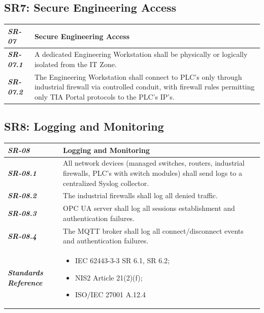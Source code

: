 \documentclass[11pt,a4paper]{article}
\begin{document}
\subsection{SR7: Secure Engineering Access}\label{SR7}
\begin{tabularx}{\textwidth}{>{\bfseries}p{2.5cm} X}
    \textit{SR-07} & \textbf{Secure Engineering Access} \vspace{0.5em}\\
\toprule
\textit{SR-07.1} &
    A dedicated Engineering Workstation shall be physically or logically isolated from the IT Zone.
    \vspace{0.5em}
\\
\textit{SR-07.2} &
    The Engineering Workstation shall connect to PLC's only through industrial firewall via controlled conduit, with firewall rules permitting only TIA Portal protocols to the PLC's IP's. 
    \vspace{0.5em}
    \\
\end{tabularx}
\vspace{2em}

\subsection{SR8: Logging and Monitoring}\label{SR8}
\begin{tabularx}{\textwidth}{>{\bfseries}p{2.5cm} X}
    \textit{SR-08} & \textbf{Logging and Monitoring} \vspace{0.5em}\\
\toprule
\textit{SR-08.1} &
    All network devices (managed switches, routers, industrial firewalls, PLC's with switch modules) shall send logs to a centralized Syslog collector.
    \vspace{0.5em}
\\
\textit{SR-08.2} &
    The industrial firewalls shall log all denied traffic.
    \vspace{0.5em}
    \\
\textit{SR-08.3} &
    OPC UA server shall log all sessions establishment and authentication failures.
    \vspace{0.5em}
    \\
\textit{SR-08.4} &
    The MQTT broker shall log all connect/disconnect events and authentication failures.
    \vspace{0.5em}
    \\
\midrule
    \textit{Standards Reference} &
\begin{itemize}[label=-, noitemsep, topsep=0pt, leftmargin=*]
    \item IEC 62443-3-3 SR 6.1, SR 6.2;
    \item NIS2 Article 21(2)(f); 
    \item ISO/IEC 27001 A.12.4
\end{itemize} \vspace{1em} \\ 
\end{tabularx}
\vspace{2em}
\end{document}
